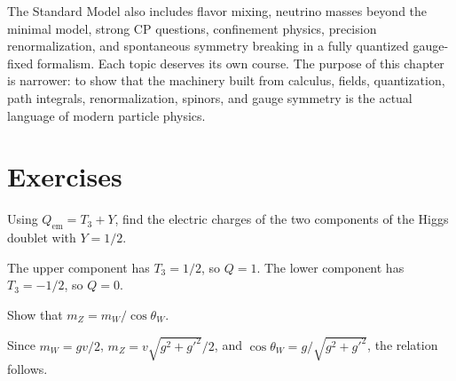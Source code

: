 The Standard Model also includes flavor mixing, neutrino masses beyond the minimal model, strong CP questions, confinement physics, precision renormalization, and spontaneous symmetry breaking in a fully quantized gauge-fixed formalism.  Each topic deserves its own course.  The purpose of this chapter is narrower: to show that the machinery built from calculus, fields, quantization, path integrals, renormalization, spinors, and gauge symmetry is the actual language of modern particle physics.

\section*{Exercises}

\begin{exercise}
Using \(Q_{\text{em}}=T_3+Y\), find the electric charges of the two components of the Higgs doublet with \(Y=1/2\).
\begin{answer}
The upper component has \(T_3=1/2\), so \(Q=1\).  The lower component has \(T_3=-1/2\), so \(Q=0\).
\end{answer}
\end{exercise}

\begin{exercise}
Show that \(m_Z=m_W/\cos\theta_W\).
\begin{answer}
Since \(m_W=gv/2\), \(m_Z=v\sqrt{g^2+g'^2}/2\), and \(\cos\theta_W=g/\sqrt{g^2+g'^2}\), the relation follows.
\end{answer}
\end{exercise}

